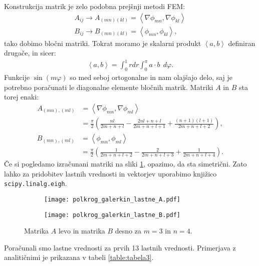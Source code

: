 \documentclass[12pt,a4paper]{article}
\begin{document}
Konstrukcija matrik je zelo podobna prejšnji metodi FEM:
\begin{align*}
A_{ij} \rightarrow A_{(mn)(kl)}= \left\langle \nabla \phi_{mn} , \nabla \phi_{kl} \right\rangle \\
B_{ij} \rightarrow B_{(mn)(kl)}= \left\langle  \phi_{mn} ,  \phi_{kl} \right\rangle,
\end{align*}
tako dobimo bločni matriki. Tokrat moramo je skalarni produkt $\left\langle  a ,  b \right\rangle$ definiran drugače, in sicer:
\begin{align*}
\left\langle  a ,  b \right\rangle = \int _0 ^{1} r dr \int_0 ^{\pi} a \cdot b \ \ d \varphi .
\end{align*}
Funkcije $\sin (m \varphi)$ so med seboj ortogonalne in nam olajšajo delo, saj je potrebno poračunati le diagonalne elemente bločnih matrik. Matriki $A$ in $B$ sta torej enaki:
\begin{align}
A_{(mn),(ml)} & =\left\langle \nabla \phi_{mn} , \nabla \phi_{ml} \right\rangle \nonumber \\ & = \frac{\pi}{2} \left( \frac{nl}{2m +n +l} - \frac{2nl + n +l}{2m +n +l +1} + \frac{(n+1)(l+1)}{2m +n +l+2}\right),
\end{align}
\begin{align}
 B_{(mn),(ml)} & =\left\langle \phi_{mn} , \phi_{ml} \right\rangle \nonumber \\ & = \frac{\pi}{2} \left( \frac{1}{2m +n +l +2} - \frac{2}{2m +n +l +3} + \frac{1}{2m +n +l+4}\right).
\end{align}
Če si pogledamo izračunani matriki na sliki \ref{fig:slika11}, opazimo, da sta simetrični. Zato lahko za pridobitev lastnih vrednosti in vektorjev uporabimo knjižico \texttt{scipy.linalg.eigh}.

\begin{figure}[H]
    \centering
    \begin{subfigure}[b]{0.35\textwidth}  			
        \texttt{[image: polkrog\_galerkin\_lastne\_A.pdf]}
    \end{subfigure}
    \begin{subfigure}[b]{0.35\textwidth}  			
        \texttt{[image: polkrog\_galerkin\_lastne\_B.pdf]}
    \end{subfigure}
    \caption{Matrika $A$ levo in matrika $B$ desno za $m=3$ in $n=4$.} \label{fig:slika11}
\end{figure}

\noindent Poračunali smo lastne vrednosti za prvih 13 lastnih vrednosti. Primerjava z analitičnimi je prikazana v tabeli \ref{table:tabela3}.
\end{document}
